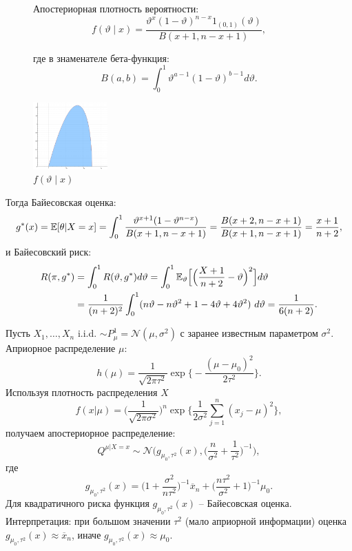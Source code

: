\begin{exmp}
\begin{itemize}
									
				\begin{figure}[!htb]\centering
					\begin{minipage}{0.7\textwidth}
						Апостериорная плотность вероятности:
						\[f(\vartheta \mid x) = \frac{\vartheta^x (1-\vartheta)^{n-x} 1_{(0,1)}(\vartheta)}{B(x+1, n-x+1)}, \]
						
						где в знаменателе бета-функция:
						\[B(a,b)=\int_{0}^{1} \vartheta^{a-1} (1-\vartheta)^{b-1} d \vartheta. \]
					\end{minipage}
					\begin{minipage}{0.18\textwidth}\centering
						\includegraphics[width=\linewidth, height=2.6cm, right]{beta}
						\captionsetup{labelformat=empty}
						\caption{$f(\vartheta \mid x)$}
					\end{minipage}
				\end{figure}
			
			Тогда Байесовская оценка:
		\[g^*(x)=\mathbb{E}[\theta|X=x]=\int_0^1 \frac{\vartheta^{x+1}(1-\vartheta^{n-x})}{B(x+1, n-x+1)}=\frac{B(x+2, n-x+1)}{B(x+1, n-x+1)} =\frac{x+1}{n+2},\]
		и Байесовский риск:
		\[
		\begin{aligned}
			R(\pi,g^*) & =\int_0^1 R(\vartheta, g^*) d\vartheta=\int_0^1 \mathbb{E}_\vartheta\Big[\Big(\frac{X+1}{n+2}-\vartheta \Big)^2\Big]d\vartheta \\
			 & =\frac{1}{(n+2)^2} \int_0^1 (n\vartheta - n\vartheta^2+1-4\vartheta+4\vartheta^2)\ d\vartheta=\frac{1}{6(n+2)}.  
		\end{aligned}
		\]
	\end{itemize}
\end{exmp}

\begin{exmp}
	Пусть $X_1, \dots, X_n$ i.i.d. $\sim P_\mu^1=\mathcal{N}(\mu, \sigma^2)$ с заранее известным параметром $\sigma^2$. Априорное распределение $\mu$:
	\[ 
	h(\mu) = \frac{1}{\sqrt{2 \pi \tau^2}} \exp \Big\{ -\frac{(\mu-\mu_0)^2}{2\tau^2} \Big\}.
	\]
	Используя плотность распределения $X$
	\[
	f(x|\mu)=\Big( \frac{1}{\sqrt{2\pi \sigma^2}}\Big)^n \exp \Big\{ \frac{1}{2\sigma^2}\sum_{j=1}^n(x_j-\mu)^2 \Big \},
	\]
	получаем апостериорное распределение:
	\[  
	Q^{\mu|X=x} \sim \mathcal{N} \Big( g_{\mu_0, \tau^2}(x), \Big( \frac{n}{\sigma^2} + \frac{1}{\tau^2}\Big)^{-1}  \Big),
	\]
	где
	\[ 
	g_{\mu_0, \tau^2}(x)=\Big( 1 + \frac{\sigma^2}{n \tau^2} \Big)^{-1} \overline{x}_n+\Big( \frac{n \tau^2}{\sigma^2}+1 \Big)^{-1} \mu_0.
	\]
	Для квадратичного риска функция $g_{\mu_0, \tau^2}(x)$ -- Байесовская оценка. Интерпретация: при большом значении $\tau^2$ (мало априорной информации) оценка $g_{\mu_0, \tau^2}(x) \approx \overline{x}_n$, иначе $g_{\mu_0, \tau^2}(x) \approx \mu_0$.
\end{exmp}

